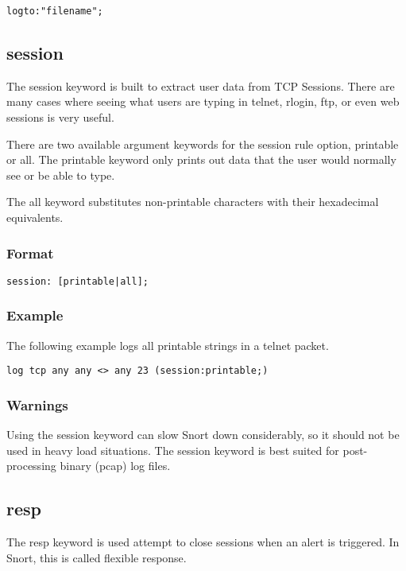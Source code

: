 \documentclass[english]{report}
\begin{document}
\begin{verbatim}
logto:"filename";
\end{verbatim}

\subsection{session}

The session keyword is built to extract user data from TCP Sessions.  There are
many cases where seeing what users are typing in telnet, rlogin, ftp, or even
web sessions is very useful. 

There are two available argument keywords for the session rule option,
printable or all. The printable keyword only prints out data that the user
would normally see or be able to type. 

The all keyword substitutes non-printable characters with their hexadecimal
equivalents. 

\subsubsection{Format}

\begin{verbatim}
session: [printable|all];
\end{verbatim}

\subsubsection{Example}
The following example logs all printable strings in a telnet packet.
\begin{verbatim}
log tcp any any <> any 23 (session:printable;)
\end{verbatim}

\subsubsection{Warnings}
Using the session keyword can slow Snort down considerably, so it should not be
used in heavy load situations. The session keyword is best suited for
post-processing binary (pcap) log files. 

\subsection{resp}

The resp keyword is used attempt to close sessions when an alert is triggered.  In Snort, this is called flexible response.
\end{document}
